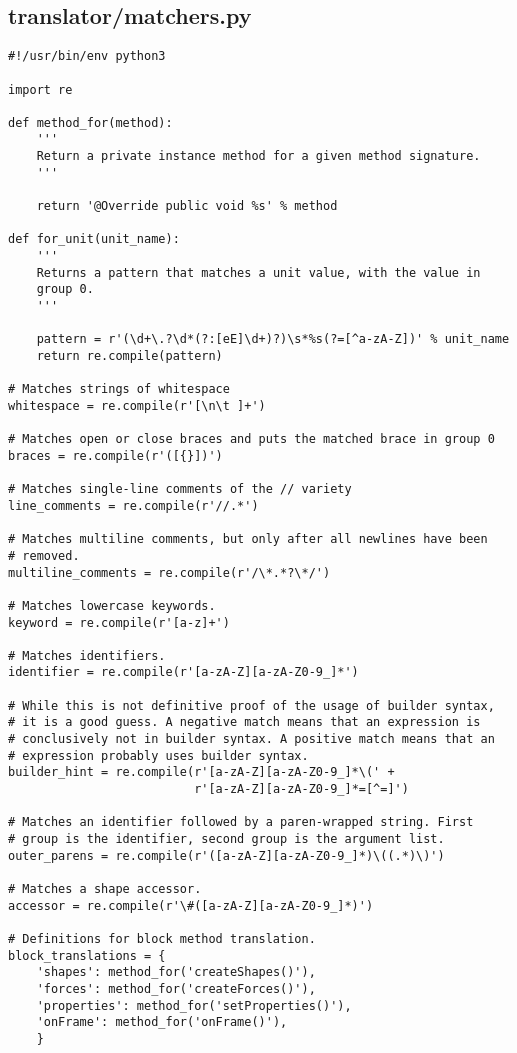 \subsection*{translator/matchers.py}
\begin{lstlisting}
#!/usr/bin/env python3

import re

def method_for(method):
    '''
    Return a private instance method for a given method signature.
    '''

    return '@Override public void %s' % method

def for_unit(unit_name):
    '''
    Returns a pattern that matches a unit value, with the value in
    group 0.
    '''

    pattern = r'(\d+\.?\d*(?:[eE]\d+)?)\s*%s(?=[^a-zA-Z])' % unit_name
    return re.compile(pattern)

# Matches strings of whitespace
whitespace = re.compile(r'[\n\t ]+')

# Matches open or close braces and puts the matched brace in group 0
braces = re.compile(r'([{}])')

# Matches single-line comments of the // variety
line_comments = re.compile(r'//.*')

# Matches multiline comments, but only after all newlines have been
# removed.
multiline_comments = re.compile(r'/\*.*?\*/')

# Matches lowercase keywords.
keyword = re.compile(r'[a-z]+')

# Matches identifiers.
identifier = re.compile(r'[a-zA-Z][a-zA-Z0-9_]*')

# While this is not definitive proof of the usage of builder syntax,
# it is a good guess. A negative match means that an expression is
# conclusively not in builder syntax. A positive match means that an
# expression probably uses builder syntax.
builder_hint = re.compile(r'[a-zA-Z][a-zA-Z0-9_]*\(' +
                          r'[a-zA-Z][a-zA-Z0-9_]*=[^=]')

# Matches an identifier followed by a paren-wrapped string. First
# group is the identifier, second group is the argument list.
outer_parens = re.compile(r'([a-zA-Z][a-zA-Z0-9_]*)\((.*)\)')

# Matches a shape accessor.
accessor = re.compile(r'\#([a-zA-Z][a-zA-Z0-9_]*)')

# Definitions for block method translation.
block_translations = {
    'shapes': method_for('createShapes()'),
    'forces': method_for('createForces()'),
    'properties': method_for('setProperties()'),
    'onFrame': method_for('onFrame()'),
    }
\end{lstlisting}

